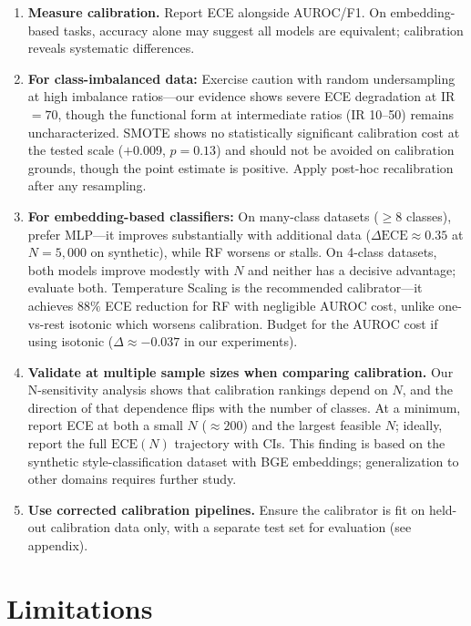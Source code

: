 \documentclass[11pt]{article}
\begin{document}
\begin{enumerate}[leftmargin=*,nosep]
 \item \textbf{Measure calibration.} Report ECE alongside AUROC/F1. On embedding-based tasks, accuracy alone may suggest all models are equivalent; calibration reveals systematic differences.
 \item \textbf{For class-imbalanced data:} Exercise caution with random undersampling at high imbalance ratios---our evidence shows severe ECE degradation at IR $=70$, though the functional form at intermediate ratios (IR 10--50) remains uncharacterized. SMOTE shows no statistically significant calibration cost at the tested scale ($+0.009$, $p = 0.13$) and should not be avoided on calibration grounds, though the point estimate is positive. Apply post-hoc recalibration after any resampling.
 \item \textbf{For embedding-based classifiers:} On many-class datasets ($\geq 8$ classes), prefer MLP---it improves substantially with additional data ($\Delta\text{ECE} \approx 0.35$ at $N{=}5{,}000$ on synthetic), while RF worsens or stalls. On 4-class datasets, both models improve modestly with $N$ and neither has a decisive advantage; evaluate both. Temperature Scaling is the recommended calibrator---it achieves $88\%$ ECE reduction for RF with negligible AUROC cost, unlike one-vs-rest isotonic which worsens calibration. Budget for the AUROC cost if using isotonic ($\Delta \approx -0.037$ in our experiments).
 \item \textbf{Validate at multiple sample sizes when comparing calibration.} Our N-sensitivity analysis shows that calibration rankings depend on $N$, and the direction of that dependence flips with the number of classes. At a minimum, report ECE at both a small $N$ ($\approx 200$) and the largest feasible $N$; ideally, report the full $\text{ECE}(N)$ trajectory with CIs. This finding is based on the synthetic style-classification dataset with BGE embeddings; generalization to other domains requires further study.
 \item \textbf{Use corrected calibration pipelines.} Ensure the calibrator is fit on held-out calibration data only, with a separate test set for evaluation (see appendix).
\end{enumerate}

\section{Limitations}
\end{document}
